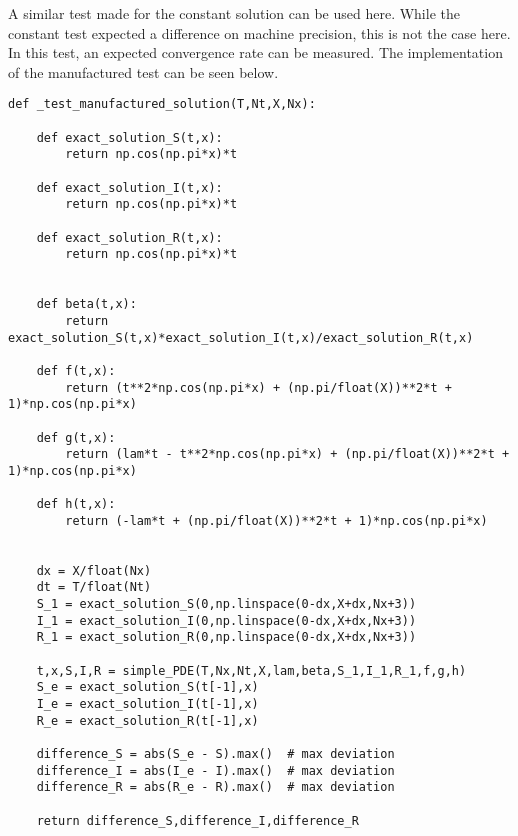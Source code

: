 \documentclass[%
twoside,                 %
final,                   %
chapterprefix=true,      %
open=right               %
10pt]{book}
\begin{document}
A similar test made for the constant solution can be used here. While the constant test expected a difference on machine precision, this is not the case here. In this test, an expected convergence rate can be measured. The implementation of the manufactured test can be seen below.

\begin{Verbatim}[numbers=none,fontsize=\fontsize{9pt}{9pt},baselinestretch=0.95]
def _test_manufactured_solution(T,Nt,X,Nx):
    
    def exact_solution_S(t,x):
        return np.cos(np.pi*x)*t

    def exact_solution_I(t,x):
        return np.cos(np.pi*x)*t

    def exact_solution_R(t,x):
        return np.cos(np.pi*x)*t


    def beta(t,x):
        return exact_solution_S(t,x)*exact_solution_I(t,x)/exact_solution_R(t,x)
   
    def f(t,x):
        return (t**2*np.cos(np.pi*x) + (np.pi/float(X))**2*t + 1)*np.cos(np.pi*x) 

    def g(t,x):
        return (lam*t - t**2*np.cos(np.pi*x) + (np.pi/float(X))**2*t + 1)*np.cos(np.pi*x)

    def h(t,x):
        return (-lam*t + (np.pi/float(X))**2*t + 1)*np.cos(np.pi*x)
        

    dx = X/float(Nx)
    dt = T/float(Nt)
    S_1 = exact_solution_S(0,np.linspace(0-dx,X+dx,Nx+3))
    I_1 = exact_solution_I(0,np.linspace(0-dx,X+dx,Nx+3))
    R_1 = exact_solution_R(0,np.linspace(0-dx,X+dx,Nx+3))
     
    t,x,S,I,R = simple_PDE(T,Nx,Nt,X,lam,beta,S_1,I_1,R_1,f,g,h)
    S_e = exact_solution_S(t[-1],x)
    I_e = exact_solution_I(t[-1],x)
    R_e = exact_solution_R(t[-1],x)
    
    difference_S = abs(S_e - S).max()  # max deviation
    difference_I = abs(I_e - I).max()  # max deviation
    difference_R = abs(R_e - R).max()  # max deviation

    return difference_S,difference_I,difference_R
\end{Verbatim}
\end{document}
